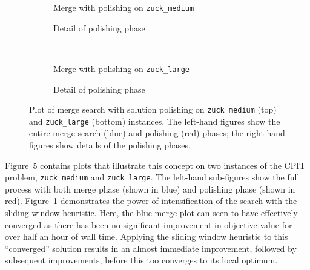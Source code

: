 \documentclass[authoryear,11pt,square,number,times,super,comma]{elsarticle}
\newcommand{\zuckmed}{\texttt{zuck\_medium}}
\newcommand{\zucklarge}{\texttt{zuck\_large}}
\begin{document}
\begin{figure}[t!]
    \centering
    \begin{subfigure}[t]{0.4\textwidth}
    \centering
    \vspace*{-5mm}\caption{Merge with polishing on \zuckmed{}}
    \label{plot:polish.med1}
    \end{subfigure}
    \quad
    \begin{subfigure}[t]{0.4\textwidth}
    \centering
    \caption{Detail of polishing phase}
    \label{plot:polish.med2}
    \end{subfigure}
    \\[5mm]
    \centering
    \begin{subfigure}[t]{0.4\textwidth}
    \centering
    \vspace*{-5mm}\caption{Merge with polishing on \zucklarge{}}
    \label{plot:polish.large1}
    \end{subfigure}
    \quad
    \begin{subfigure}[t]{0.4\textwidth}
    \centering
    \vspace*{-5mm}\caption{Detail of polishing phase}
    \label{plot:polish.large2}
    \end{subfigure}
    \caption[Plot of merge search with solution polishing on \zuckmed{} and \zucklarge{} instances]{Plot of merge search with solution polishing on \zuckmed{} (top) and \zucklarge{} (bottom) instances. The left-hand figures show the entire merge search (blue) and polishing (red) phases; the right-hand figures show details of the polishing phases.}
    \label{plot:mine:polish}
\end{figure}

Figure~\ref{plot:mine:polish} contains plots that illustrate this concept on two instances of the CPIT problem, \zuckmed{} and \zucklarge{}. The left-hand sub-figures show the full process with both merge phase (shown in blue) and polishing phase (shown in red). Figure~\ref{plot:polish.med1} demonstrates the power of intensification of the search with the sliding window heuristic. Here, the blue merge plot can seen to have effectively converged as there has been no significant improvement in objective value for over half an hour of wall time. Applying the sliding window heuristic to this ``converged'' solution results in an almost immediate improvement, followed by subsequent improvements, before this too converges to its local optimum.
\end{document}
